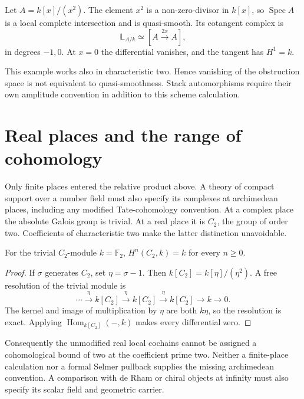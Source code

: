 \begin{example}\label{v4-arith:coefficients:ex:quasismooth}
Let \(A=k[x]/(x^2)\). The element \(x^2\) is a non-zero-divisor
in \(k[x]\), so \(\operatorname{Spec}A\) is a local complete
intersection and is quasi-smooth. Its cotangent complex is
\[
 \mathbb L_{A/k}\simeq
 [A\xrightarrow{\,2x\,}A],
\]
in degrees \(-1,0\). At \(x=0\) the differential vanishes, and
the tangent has \(H^1=k\).

This example works also in characteristic
two. Hence vanishing of the obstruction space is not equivalent to
quasi-smoothness. Stack automorphisms require their own amplitude
convention in addition to this scheme calculation.
\end{example}

\section{Real places and the range of cohomology}
\label{v4-arith:coefficients:sec:real}

Only finite places entered the relative product above. A theory of
compact support over a number field must also specify its complexes
at archimedean places, including any modified Tate-cohomology
convention. At a complex place the absolute Galois group is trivial.
At a real place it is \(C_2\), the group of order two. Coefficients
of characteristic two make the latter distinction unavoidable.

\begin{proposition}\label{v4-arith:coefficients:prop:real-two}
For the trivial \(C_2\)-module \(k=\mathbb F_2\),
\(H^n(C_2,k)=k\) for every \(n\geq0\).
\end{proposition}
\begin{proof}
If \(\sigma\) generates \(C_2\), set \(\eta=\sigma-1\).
Then \(k[C_2]=k[\eta]/(\eta^2)\). A free resolution of the
trivial module is
\[
 \cdots\xrightarrow{\eta}k[C_2]\xrightarrow{\eta}k[C_2]
 \xrightarrow{\eta}k[C_2]\longrightarrow k\longrightarrow0.
\]
The kernel and image of multiplication by \(\eta\) are both
\(k\eta\), so the resolution is exact. Applying
\(\operatorname{Hom}_{k[C_2]}(-,k)\) makes every differential zero.
\end{proof}

Consequently the unmodified real local cochains cannot be assigned a
cohomological bound of two at the coefficient prime two. Neither a
finite-place calculation nor a formal Selmer pullback supplies the
missing archimedean convention. A comparison with de Rham or chiral
objects at infinity must also specify its scalar field and geometric
carrier.

